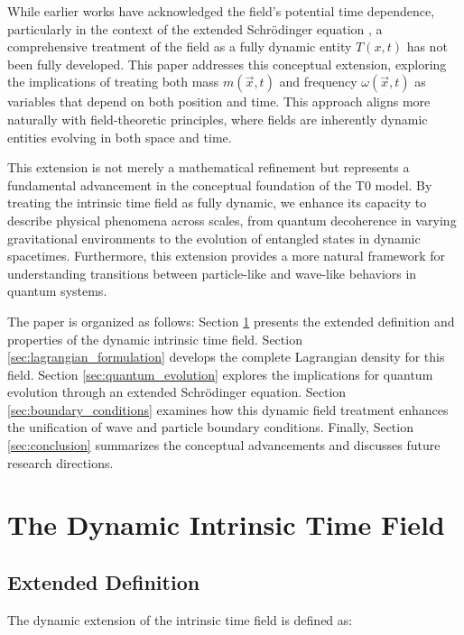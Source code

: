 \documentclass[12pt,a4paper]{article}
\newcommand{\Tfieldt}{T(x,t)}
\newcommand{\vecx}{\vec{x}}
\begin{document}
	While earlier works have acknowledged the field's potential time dependence, particularly in the context of the extended Schrödinger equation \cite{pascher_quantum_2025}, a comprehensive treatment of the field as a fully dynamic entity $\Tfieldt$ has not been fully developed. This paper addresses this conceptual extension, exploring the implications of treating both mass $m(\vecx,t)$ and frequency $\omega(\vecx,t)$ as variables that depend on both position and time. This approach aligns more naturally with field-theoretic principles, where fields are inherently dynamic entities evolving in both space and time.
	
	This extension is not merely a mathematical refinement but represents a fundamental advancement in the conceptual foundation of the T0 model. By treating the intrinsic time field as fully dynamic, we enhance its capacity to describe physical phenomena across scales, from quantum decoherence in varying gravitational environments to the evolution of entangled states in dynamic spacetimes. Furthermore, this extension provides a more natural framework for understanding transitions between particle-like and wave-like behaviors in quantum systems.
	
	The paper is organized as follows: Section \ref{sec:dynamic_time_field} presents the extended definition and properties of the dynamic intrinsic time field. Section \ref{sec:lagrangian_formulation} develops the complete Lagrangian density for this field. Section \ref{sec:quantum_evolution} explores the implications for quantum evolution through an extended Schrödinger equation. Section \ref{sec:boundary_conditions} examines how this dynamic field treatment enhances the unification of wave and particle boundary conditions. Finally, Section \ref{sec:conclusion} summarizes the conceptual advancements and discusses future research directions.
	
	\section{The Dynamic Intrinsic Time Field}
	\label{sec:dynamic_time_field}
	
	\subsection{Extended Definition}
	\label{subsec:extended_definition}
	
	The dynamic extension of the intrinsic time field is defined as:
	
\end{document}
